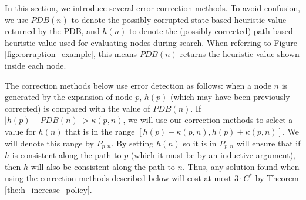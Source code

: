 \documentclass[letterpaper]{article}
\begin{document}
In this section, we introduce several error correction methods.
To avoid confusion, we use $PDB(n)$ to denote the possibly corrupted state-based heuristic value returned by the PDB, and $h(n)$ to denote the (possibly corrected) path-based heuristic value used for evaluating nodes during search.
When referring to Figure \ref{fig:corruption_example}, this means $PDB(n)$ returns the heuristic value shown inside each node.

The correction methods below use error detection as follows: when a node $n$ is generated by the expansion of node $p$, $h(p)$ (which may have been previously corrected) is compared with the value of $PDB(n)$.
If $|h(p) - PDB(n)| > \kappa(p, n)$, we will use our correction methods to select a value for $h(n)$ that is in the range $[h(p)-\kappa(p,n),h(p)+\kappa(p,n)]$.
We will denote this range by $P_{p,n}$.
By setting $h(n)$ so it is in $P_{p,n}$ will ensure that if $h$ is consistent along the path to $p$ (which it must be by an inductive argument), then $h$ will also be consistent along the path to $n$. 
Thus, any solution found when using the correction methods described below will cost at most $3 \cdot C^*$  by Theorem \ref{the:h_increase_policy}.


%







\end{document}
